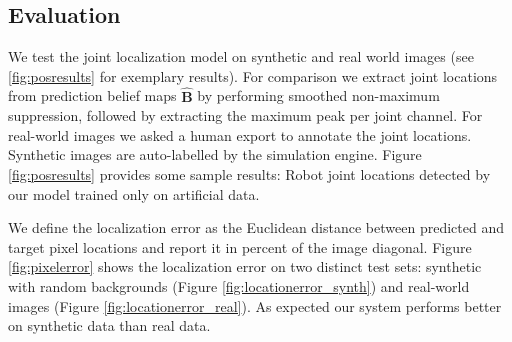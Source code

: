 \documentclass[conference]{IEEEtran}
\begin{document}
    \subsection{Evaluation}
    We test the joint localization model on synthetic and real world images (see \ref{fig:posresults} for exemplary results). For comparison we extract joint locations from prediction belief maps $\hat{\mathbf{B}}$ by performing smoothed non-maximum suppression, followed by extracting the maximum peak per joint channel. For real-world images we asked a human export to annotate the joint locations. Synthetic images are auto-labelled by the simulation engine. Figure \ref{fig:posresults} provides some sample results: Robot joint locations detected by our model trained only on artificial data.
    
    We define the localization error as the Euclidean distance between predicted and target pixel locations and report it in percent of the image diagonal. Figure \ref{fig:pixelerror} shows the localization error on two distinct test sets: synthetic with random backgrounds (Figure \ref{fig:locationerror_synth}) and real-world images (Figure \ref{fig:locationerror_real}). As expected our system performs better on synthetic data than real data.
\end{document}
